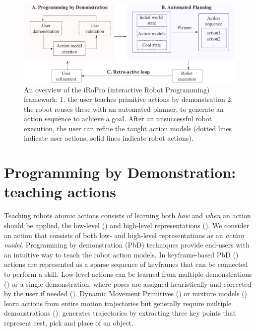 \begin{figure}[!h]
	\centering
	\includegraphics[width=\linewidth]{figures/framework.png}
	\caption{An overview of the iRoPro (interactive Robot Programming) framework: 1. the user teaches primitive actions by demonstration 2. the robot reuses these with an automated planner, to generate an action sequence to achieve a goal.
After an unsuccessful robot execution, the user can refine the taught action models (dotted lines indicate user actions, solid lines indicate robot actions).}
	\label{fig:framework}
\end{figure}

\section{Programming by Demonstration: teaching actions}
Teaching robots atomic actions consists of learning both \textit{how} and \textit{when} an action should be applied, \ie the low-level () and high-level representations ().
We consider an action that consists of both low- and high-level representations as an \textit{action model}.
Programming by demonstration (PbD) techniques provide end-users with an intuitive way to teach the robot action models. %
In keyframe-based PbD (\cite{akgun2012keyframe,alexandrova2014robot}) actions are represented as a sparse sequence of keyframes that can be connected to perform a skill.
Low-level actions can be learned from multiple demonstrations (\cite{niekum2012learning}) or a single demonstration, where poses are assigned heuristically and corrected by the user if needed (\cite{alexandrova2014robot}).
Dynamic Movement Primitives (\cite{pastor2009learning}) or mixture models (\cite{calinon2007incremental}) learn actions from entire motion trajectories but generally require multiple demonstrations (\cite{abdo2013learning}).
\cite{ahmadzadeh2013visuospatial} generates trajectories by extracting three key points that represent rest, pick and place of an object.

